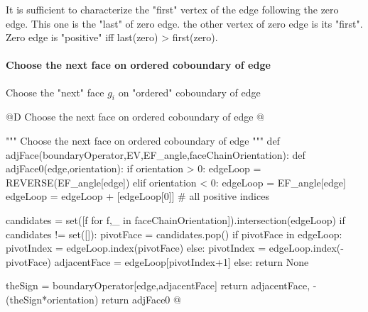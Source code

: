 \documentclass[11pt,oneside]{article}    %
\begin{document}
It is sufficient to characterize the "first" vertex of the edge following the zero edge. This one is the "last" of zero edge. the other vertex of zero edge is its "first". Zero edge is "positive" iff last(zero) > first(zero).


\paragraph{Choose the next face on ordered coboundary of edge}
Choose the "next" face $g_i$  on "ordered" coboundary of edge


@D Choose the next face on ordered coboundary of edge
@{""" Choose the next face on ordered coboundary of edge """
def adjFace(boundaryOperator,EV,EF_angle,faceChainOrientation):
    def adjFace0(edge,orientation):
        if orientation > 0:  edgeLoop = REVERSE(EF_angle[edge])
        elif orientation < 0:  edgeLoop = EF_angle[edge]
        edgeLoop = edgeLoop + [edgeLoop[0]]  # all positive indices
        
        candidates = set([f for f,_ in faceChainOrientation]).intersection(edgeLoop)
        if candidates != set([]):
            pivotFace = candidates.pop()
            if pivotFace in edgeLoop:
                pivotIndex = edgeLoop.index(pivotFace)
            else:
                pivotIndex = edgeLoop.index(-pivotFace)
            adjacentFace = edgeLoop[pivotIndex+1]
        else: return None
        
        theSign = boundaryOperator[edge,adjacentFace]
        return adjacentFace, -(theSign*orientation)
    return adjFace0
@}
\end{document}
